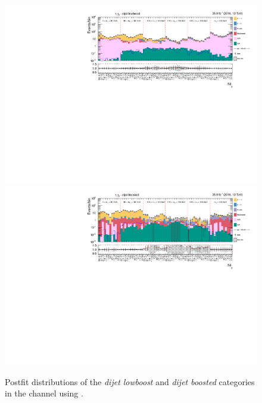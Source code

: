 \begin{figure}[h!]
    \centering
        \includegraphics[width=\textwidth]{Figures/statana/Postfit_JEC_jdphi/postfit_fit_s_htt_tt_3_13TeV.pdf}\\
        \includegraphics[width=\textwidth]{Figures/statana/Postfit_JEC_jdphi/postfit_fit_s_htt_tt_4_13TeV.pdf}
    \caption{Postfit distributions of the \textit{dijet lowboost} and \textit{dijet boosted} categories in the \tautau{} channel  using \jdphi{}.}
\end{figure}
\clearpage
